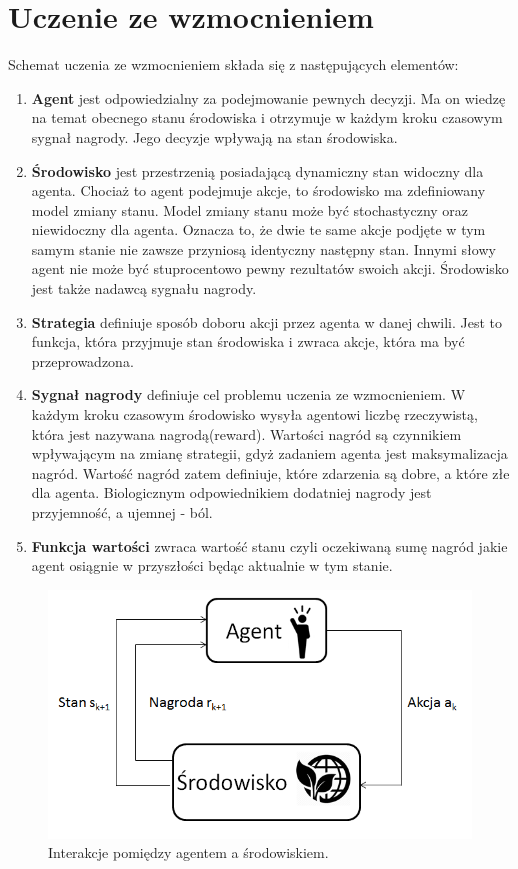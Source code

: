 \documentclass[12pt]{book}
\theoremstyle{plain}
\begin{document}
\section{Uczenie ze wzmocnieniem}
Schemat uczenia ze wzmocnieniem składa się z następujących elementów:
\begin{enumerate}
\item \textbf{Agent} jest odpowiedzialny za podejmowanie pewnych decyzji. Ma on wiedzę na temat obecnego stanu środowiska i otrzymuje w każdym kroku czasowym sygnał nagrody. Jego decyzje wpływają na stan środowiska.
\item \textbf{Środowisko} jest przestrzenią posiadającą dynamiczny stan widoczny dla agenta. Chociaż to agent podejmuje akcje, to środowisko ma zdefiniowany model zmiany stanu. Model zmiany stanu może być stochastyczny oraz niewidoczny dla agenta. Oznacza to, że dwie te same akcje podjęte w tym samym stanie nie zawsze przyniosą identyczny następny stan. Innymi słowy agent nie może być stuprocentowo pewny rezultatów swoich akcji. Środowisko jest także nadawcą sygnału nagrody.
\item \textbf{Strategia} definiuje sposób doboru akcji przez agenta w danej chwili. Jest to funkcja, która przyjmuje stan środowiska i zwraca akcje, która ma być przeprowadzona. 
\item \textbf{Sygnał nagrody} definiuje cel problemu uczenia ze wzmocnieniem. W każdym kroku czasowym środowisko wysyła agentowi liczbę rzeczywistą, która jest nazywana nagrodą(reward). Wartości nagród są czynnikiem wpływającym na zmianę strategii, gdyż zadaniem agenta jest maksymalizacja nagród. Wartość nagród zatem definiuje, które zdarzenia są dobre, a które złe dla agenta. Biologicznym odpowiednikiem dodatniej nagrody jest przyjemność, a ujemnej - ból. 
\item \textbf{Funkcja wartości} zwraca wartość stanu czyli oczekiwaną sumę nagród jakie agent osiągnie w przyszłości będąc aktualnie w tym stanie. 
\end{enumerate}
\begin{figure}[H]
  \centering
    \includegraphics[width=14cm]{agent-srodowisko}
 \caption{Interakcje pomiędzy agentem a środowiskiem.}
 \label{fig:agent-srodowisko}
\end{figure}
\end{document}
